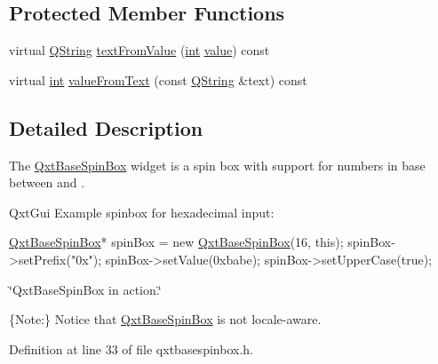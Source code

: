 \subsection*{Protected Member Functions}
\begin{DoxyCompactItemize}
\item 
virtual \hyperlink{group___u_a_v_objects_plugin_gab9d252f49c333c94a72f97ce3105a32d}{Q\-String} \hyperlink{class_qxt_base_spin_box_afeb8753d69f374f915ae406b198ea313}{text\-From\-Value} (\hyperlink{ioapi_8h_a787fa3cf048117ba7123753c1e74fcd6}{int} \hyperlink{glext_8h_aa0e2e9cea7f208d28acda0480144beb0}{value}) const 
\item 
virtual \hyperlink{ioapi_8h_a787fa3cf048117ba7123753c1e74fcd6}{int} \hyperlink{class_qxt_base_spin_box_a243fe57ecfb2ee8041878e50dc7cca86}{value\-From\-Text} (const \hyperlink{group___u_a_v_objects_plugin_gab9d252f49c333c94a72f97ce3105a32d}{Q\-String} \&text) const 
\end{DoxyCompactItemize}


\subsection{Detailed Description}
The \hyperlink{class_qxt_base_spin_box}{Qxt\-Base\-Spin\-Box} widget is a spin box with support for numbers in base between {} and {}. 

Qxt\-Gui Example spinbox for hexadecimal input\-: 
\begin{DoxyCode}
\hyperlink{class_qxt_base_spin_box}{QxtBaseSpinBox}* spinBox = \textcolor{keyword}{new} \hyperlink{class_qxt_base_spin_box}{QxtBaseSpinBox}(16, \textcolor{keyword}{this});
spinBox->setPrefix(\textcolor{stringliteral}{"0x"});
spinBox->setValue(0xbabe);
spinBox->setUpperCase(\textcolor{keyword}{true});
\end{DoxyCode}


\char`\"{}\-Qxt\-Base\-Spin\-Box in action.\char`\"{}

\{Note\-:\} Notice that \hyperlink{class_qxt_base_spin_box}{Qxt\-Base\-Spin\-Box} is not locale-\/aware. 

Definition at line 33 of file qxtbasespinbox.\-h.



